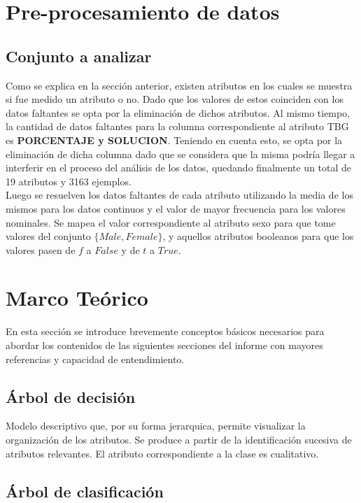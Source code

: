 \documentclass[osajnl,twocolumn,showpacs,superscriptaddress,10pt,floatfix]{revtex4-1} %
\begin{document}
\section{Pre-procesamiento de datos}
\subsection{Conjunto a analizar}

Como se explica en la sección anterior, existen atributos en los cuales se muestra si fue medido un atributo o no. Dado que los valores de estos coinciden con los datos faltantes se opta por la eliminación de dichos atributos. Al mismo tiempo, la cantidad de datos faltantes para la columna correspondiente al atributo TBG es \textbf{PORCENTAJE y SOLUCION}. Teniendo en cuenta esto, se opta por la eliminación de dicha columna dado que se considera que la misma podría llegar a interferir en el proceso del análisis de los datos, quedando finalmente un total de 19 atributos y 3163 ejemplos. \\

Luego se resuelven los datos faltantes de cada atributo utilizando la media de los mismos para los datos continuos y el valor de mayor frecuencia para los valores nominales. Se mapea el valor correspondiente al atributo sexo para que tome valores del conjunto $\{Male, Female\}$, y aquellos atributos booleanos para que los valores pasen de $f$ a $False$ y de $t$ a $True$. \\

\section{Marco Teórico}

En esta sección se introduce brevemente conceptos básicos necesarios para abordar los contenidos de las siguientes secciones del informe con mayores referencias y capacidad de entendimiento. \\

\subsection{Árbol de decisión}

Modelo descriptivo que, por su forma jerarquica, permite visualizar la organización de los atributos. Se produce a partir de la identificación sucesiva de atributos relevantes. El atributo correspondiente a la clase es cualitativo.

\subsection{Árbol de clasificación}
\end{document}
